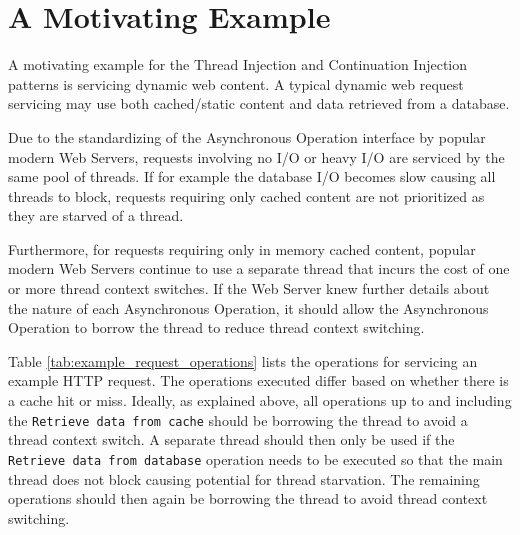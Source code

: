 \documentclass[prodmode]{style/acmlarge}
\begin{document}
\section{A Motivating Example}

A motivating example for the Thread Injection and Continuation Injection
patterns is servicing dynamic web content.  A typical dynamic web request
servicing may use both cached/static content and data retrieved from a database.

Due to the standardizing of the Asynchronous Operation interface by popular
modern Web Servers, requests involving no I/O or heavy I/O are serviced by the
same pool of threads.  If for example the database I/O becomes slow causing all
threads to block, requests requiring only cached content are not prioritized as
they are starved of a thread.

Furthermore, for requests requiring only in memory cached content, popular
modern Web Servers continue to use a separate thread that incurs the cost of one
or more thread context switches.  If the Web Server knew further details about
the nature of each Asynchronous Operation, it should allow the Asynchronous
Operation to borrow the thread to reduce thread context switching.

Table \ref{tab:example_request_operations} lists the operations for servicing an
example HTTP request.  The operations executed differ based on whether there is
a cache hit or miss.  Ideally, as explained above, all operations up to and
including the \texttt{Retrieve data from cache} should be borrowing the thread
to avoid a thread context switch.  A separate thread should then only be used if
the \texttt{Retrieve data from database} operation needs to be executed so that
the main thread does not block causing potential for thread starvation.  The
remaining operations should then again be borrowing the thread to avoid thread
context switching.
\end{document}
